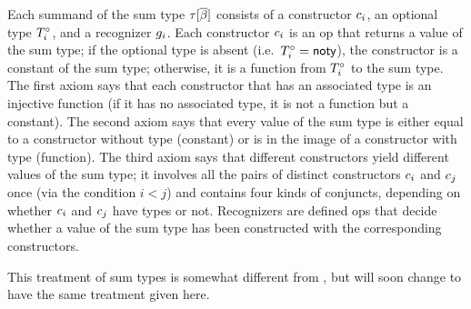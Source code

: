 Each summand of the sum type $\tau[\overline{\beta}]$ consists of a constructor
$c_i$, an optional type $T^\circ_i$, and a recognizer $g_i$. Each
constructor $c_i$ is an op that returns a value of the sum type; if the
optional type is absent (i.e.\ $T^\circ_i=\mathsf{noty}$), the constructor is a
constant of the sum type; otherwise, it is a function from $T^\circ_i$ to the
sum type. The first axiom says that each constructor that has an associated
type is an injective function (if it has no associated type, it is not a
function but a constant). The second axiom says that every value of the sum
type is either equal to a constructor without type (constant) or is in the
image of a constructor with type (function). The third axiom says that
different constructors yield different values of the sum type; it involves all
the pairs of distinct constructors $c_i$ and $c_j$ once (via the
condition $i<j$) and contains four kinds of conjuncts, depending on whether
$c_i$ and $c_j$ have types or not. Recognizers are defined ops that
decide whether a value of the sum type has been constructed with the
corresponding constructors.

This treatment of sum types is somewhat different from \cite{lm}, but
\cite{lm} will soon change to have the same treatment given here.
